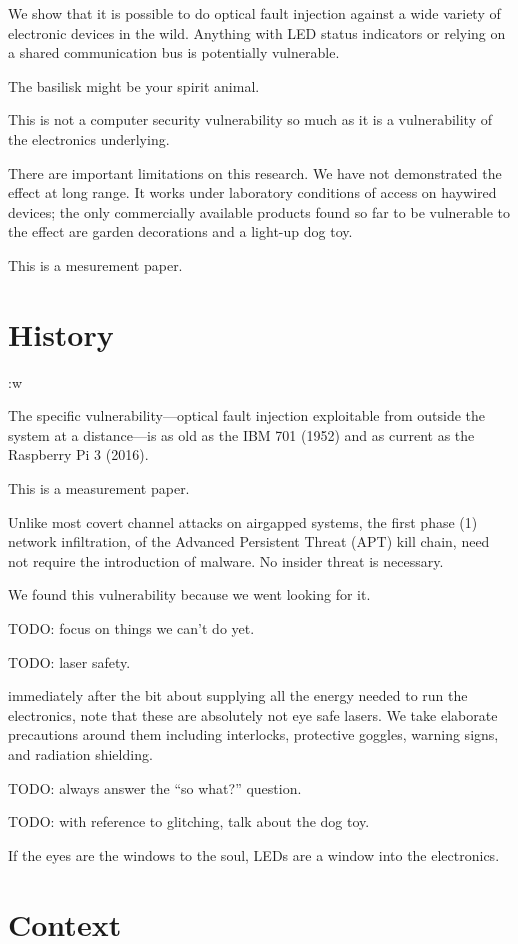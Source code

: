 \documentclass[letterpaper]{article}
\begin{document}
We show that
it is possible to do optical fault injection against a wide variety of electronic
devices in the wild. Anything with LED status indicators or relying on a shared
communication bus is potentially vulnerable.

The basilisk might be your spirit animal.

This is not a computer security vulnerability so much as it is a vulnerability
of the electronics underlying.

There are important limitations on this research. We have not demonstrated the
effect at long range. It works under laboratory conditions of access on
haywired devices; the only commercially available products found so far to be
vulnerable to the effect are garden decorations and a light-up dog toy.

This is a mesurement paper.

\section{History}:w

The specific vulnerability---optical fault injection exploitable from outside
the system at a distance---is as old as the IBM 701 (1952) and as current as
the Raspberry Pi 3 (2016).




This is a measurement paper.

Unlike most covert channel attacks on airgapped
systems, the first phase (1) network infiltration, of the Advanced Persistent
Threat (APT) kill chain, need not require the introduction of malware. No
insider threat is necessary.


We found this vulnerability because we went looking for it.

TODO: focus on things we can't do yet.

TODO: laser safety.

immediately after the bit
about supplying all the energy needed to run the electronics, note that these
are absolutely not eye safe lasers. We take elaborate precautions around them
including interlocks, protective goggles, warning signs, and radiation
shielding.

TODO: always answer the ``so what?'' question.

TODO: with reference to glitching, talk about the dog toy.

If the eyes are the windows to the soul, LEDs are a window into the electronics.

\section{Context}
\end{document}
